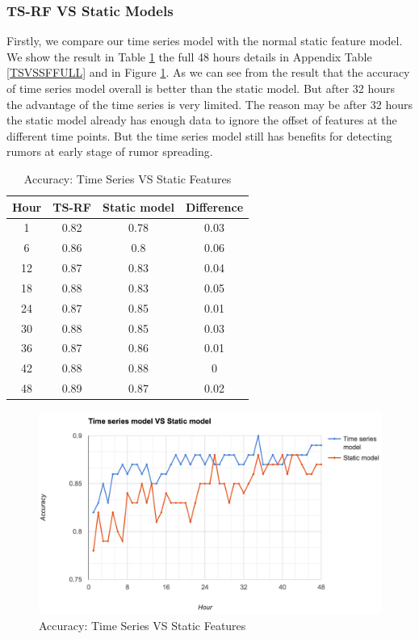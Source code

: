     \subsubsection{TS-RF VS Static Models} 

Firstly, we compare our time series model with the normal static feature model. We show the result in Table \ref{TVSF} the full 48 hours details in Appendix Table \ref{TSVSSFFULL} and in Figure \ref{fig:TVSF}. As we can see from the result that the accuracy of time series model overall is better than the static model. But after 32 hours the advantage of the time series is very limited. The reason may be after 32 hours the static model already has enough data to ignore the offset of features at the different time points. But the time series model still has benefits for detecting rumors at early stage of rumor spreading.  
 
\begin{table}[!h]
\centering
\begin{tabular}{|c|c c |c|}
\hline
Hour & TS-RF & Static model & Difference \\ \hline
1    & 0.82              & 0.78         & 0.03       \\
6    & 0.86              & 0.8          & 0.06       \\
12   & 0.87              & 0.83         & 0.04       \\
18   & 0.88              & 0.83         & 0.05       \\
24   & 0.87              & 0.85         & 0.01       \\
30   & 0.88              & 0.85         & 0.03       \\
36   & 0.87              & 0.86         & 0.01          \\
42   & 0.88              & 0.88         & 0          \\
48   & 0.89              & 0.87         & 0.02      \\\hline

\end{tabular}
\caption{Accuracy: Time Series VS Static Features}
\label{TVSF}
\end{table}

\begin{figure}[!h]
\centering
\includegraphics[width=0.8\columnwidth]{images/Vsstatic.png}
\caption{Accuracy: Time Series VS Static Features}
\label{fig:TVSF}
\end{figure}

